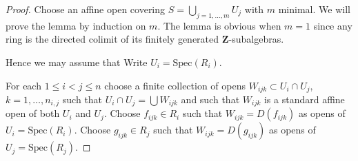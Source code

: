 \begin{proof}
Choose an affine open covering $S = \bigcup_{j = 1, \ldots, m} U_j$
with $m$ minimal. We will prove the lemma by induction on $m$.
The lemma is obvious when $m = 1$ since any ring is the
directed colimit of its finitely generated $\mathbf{Z}$-subalgebras.

\medskip\noindent
Hence we may assume that
Write $U_i = \text{Spec}(R_i)$.


For each $1 \leq i < j \leq n$ choose a finite collection
of opens $W_{ijk} \subset U_i \cap U_j$, $k = 1, \ldots, n_{i,j}$
such that $U_i \cap U_j = \bigcup W_{ijk}$ and such that
$W_{ijk}$ is a standard affine open of both $U_i$ and $U_j$.
Choose $f_{ijk} \in R_i$ such that $W_{ijk} = D(f_{ijk})$ as opens
of $U_i = \text{Spec}(R_i)$.
Choose $g_{ijk} \in R_j$ such that $W_{ijk} = D(g_{ijk})$ as opens
of $U_j = \text{Spec}(R_j)$.





\end{proof}

















